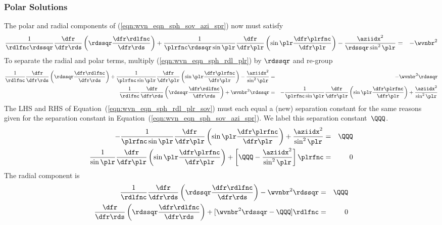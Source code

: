 \documentclass[12pt]{article}
\begin{document}
\subsubsection[Polar Solutions]{Polar Solutions}\label{sxn:mie_plr}
The polar and radial components of (\ref{eqn:wvn_eqn_sph_sov_azi_spr}) 
now must satisfy
\begin{eqnarray}
\frac{1}{\rdlfnc\rdssqr} \frac{\dfr}{\dfr\rds} 
\left( \rdssqr \frac{\dfr\rdlfnc}{\dfr\rds} \right) +
\frac{1}{\plrfnc\rdssqr\sin\plr} \frac{\dfr}{\dfr\plr}
\left( \sin\plr \frac{\dfr\plrfnc}{\dfr\plr} \right) -
\frac{\aziidx^{2}}{\rdssqr\sin^{2}\plr}
& = & -\wvnbr^{2}
\label{eqn:wvn_eqn_sph_rdl_plr}
\end{eqnarray}
To separate the radial and polar terms, multiply
(\ref{eqn:wvn_eqn_sph_rdl_plr}) by $\rdssqr$ and re-group
\begin{eqnarray}
\frac{1}{\rdlfnc} \frac{\dfr}{\dfr\rds} 
\left( \rdssqr \frac{\dfr\rdlfnc}{\dfr\rds} \right) +
\frac{1}{\plrfnc\sin\plr} \frac{\dfr}{\dfr\plr}
\left( \sin\plr \frac{\dfr\plrfnc}{\dfr\plr} \right) -
\frac{\aziidx^{2}}{\sin^{2}\plr}
& = & -\wvnbr^{2}\rdssqr \nonumber \\
\frac{1}{\rdlfnc} \frac{\dfr}{\dfr\rds} 
\left( \rdssqr \frac{\dfr\rdlfnc}{\dfr\rds} \right) +
\wvnbr^{2}\rdssqr
& = & 
- \frac{1}{\plrfnc\sin\plr} \frac{\dfr}{\dfr\plr}
\left( \sin\plr \frac{\dfr\plrfnc}{\dfr\plr} \right) 
+ \frac{\aziidx^{2}}{\sin^{2}\plr}
\label{eqn:wvn_eqn_sph_rdl_plr_sov}
\end{eqnarray}
The LHS and RHS of Equation~(\ref{eqn:wvn_eqn_sph_rdl_plr_sov}) must
each equal a (new) separation constant for the same reasons given for 
the separation constant in
Equation~(\ref{eqn:wvn_eqn_sph_sov_azi_spr}).  
We label this separation constant~$\QQQ$.
\begin{eqnarray}
- \frac{1}{\plrfnc\sin\plr} \frac{\dfr}{\dfr\plr}
\left( \sin\plr \frac{\dfr\plrfnc}{\dfr\plr} \right) 
+ \frac{\aziidx^{2}}{\sin^{2}\plr}
& = & \QQQ \nonumber \\
\frac{1}{\sin\plr} \frac{\dfr}{\dfr\plr}
\left( \sin\plr \frac{\dfr\plrfnc}{\dfr\plr} \right) 
+ \left[ \QQQ - \frac{\aziidx^{2}}{\sin^{2}\plr} \right] \plrfnc
& = & 0
\label{eqn:wvn_eqn_sph_plr_sov}
\end{eqnarray}
The radial component is
\begin{eqnarray}
\frac{1}{\rdlfnc} \frac{\dfr}{\dfr\rds} 
\left( \rdssqr \frac{\dfr\rdlfnc}{\dfr\rds} \right) -
\wvnbr^{2}\rdssqr
& = & \QQQ \nonumber \\
\frac{\dfr}{\dfr\rds} 
\left( \rdssqr \frac{\dfr\rdlfnc}{\dfr\rds} \right) +
[ \wvnbr^{2}\rdssqr - \QQQ ] \rdlfnc
& = & 0
\label{eqn:wvn_eqn_sph_rdl_sov}
\end{eqnarray}
\end{document}
